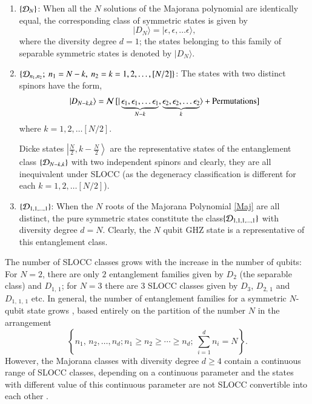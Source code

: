 \begin{enumerate}
\item $\{{\cal D}_N\}$: When all the $N$ solutions of the Majorana polynomial are identically equal, the corresponding class of  symmetric states is given by 
\begin{equation}
\vert D_N\rangle=\vert \epsilon,\epsilon,\ldots \epsilon\rangle,
\end{equation} 
where the diversity degree  $d=1$; the states belonging to this family of separable symmetric states  is denoted by $\vert D_N \rangle$.  

\item $\{{\cal D}_{n_1,n_2};\ n_1=N-k,\ n_2=k=1,2,\ldots, [N/2]\}$: The  states with two distinct spinors have the form, 
\begin{equation}
\vert D_{N-k,k}\rangle={\cal N}\,[\vert \underbrace{\epsilon_1, \epsilon_1,\ldots \epsilon_1}_{N-k}, \underbrace{\epsilon_2, \epsilon_2,\ldots \epsilon_2}_{k}\rangle+{\rm  Permutations}]\label{n1n2}
\end{equation} 
where $k=1,2, \ldots [N/2]$.  

Dicke states $\left\vert \frac{N}{2}, k-\frac{N}{2}\right\rangle$ are the representative states of the entanglement class $\{{\cal D}_{N-k,k}\}$ with two independent spinors  and clearly, they are all inequivalent under  SLOCC (as the degeneracy classification  is different for each $k=1,2, \ldots [N/2]$).

\item $\{{\cal D}_{1,1,\ldots, 1}\}$:  When the $N$ roots of the Majorana Polynomial \eqref{Maj} are all distinct, the pure symmetric states constitute  the class\break $\lbrace {\cal D}_{1,1,1,\ldots,1}\rbrace$ with diversity degree  $d=N$. Clearly, the $N$ qubit GHZ state is a representative of this entanglement class. 
\end{enumerate}
The number of SLOCC classes  grows  with the increase in the number of qubits: For $N=2$, there are only $2$ entanglement families given by 
$D_{2}$ (the separable class) and $D_{1,\,1}$; for $N=3$ there are $3$ SLOCC classes given by $D_{3}$, $D_{2,\,1}$ and $D_{1,\,1,\,1} $ etc.  In general, the number of entanglement families for a symmetric $N$-qubit state grows \cite{solano}, based entirely on the partition of the number $N$ in the arrangement 
$$\left\{n_1,\,n_2,\ldots ,n_d; n_1\geq n_2\geq\cdots\geq n_d;\   \sum_{i=1}^{d} n_i=N\right\}.$$ 
However, the Majorana classes  with diversity degree $d\geq 4$ contain a continuous range of SLOCC classes, depending on a continuous  parameter and the states with different value of this continuous  parameter  are not SLOCC convertible into each other \cite{solano}. 

